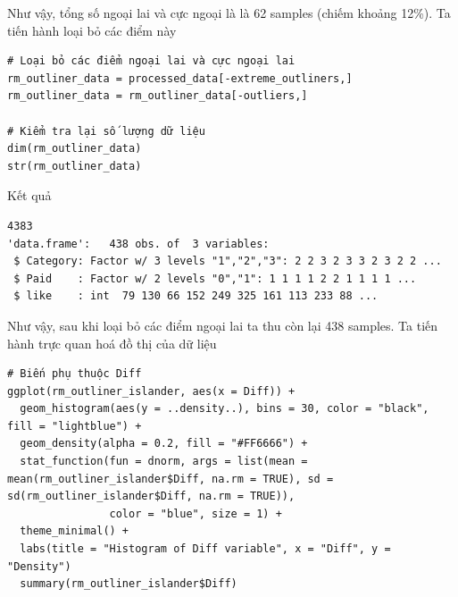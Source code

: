 \begin{itemize}
 Như vậy, tổng số ngoại lai và cực ngoại là là 62 samples (chiếm khoảng 12\%). Ta tiến hành loại bỏ các điểm này

 \begin{lstlisting}
# Loại bỏ các điểm ngoại lai và cực ngoại lai
rm_outliner_data = processed_data[-extreme_outliners,]
rm_outliner_data = rm_outliner_data[-outliers,]

# Kiểm tra lại số lượng dữ liệu
dim(rm_outliner_data)
str(rm_outliner_data)
 \end{lstlisting}
Kết quả
\begin{lstlisting}
4383
'data.frame':	438 obs. of  3 variables:
 $ Category: Factor w/ 3 levels "1","2","3": 2 2 3 2 3 3 2 3 2 2 ...
 $ Paid    : Factor w/ 2 levels "0","1": 1 1 1 1 2 2 1 1 1 1 ...
 $ like    : int  79 130 66 152 249 325 161 113 233 88 ...
\end{lstlisting}

\newpage
Như vậy, sau khi loại bỏ các điểm ngoại lai ta thu còn lại 438 samples. Ta tiến hành trực quan hoá đồ thị của dữ liệu

\begin{lstlisting}
# Biến phụ thuộc Diff
ggplot(rm_outliner_islander, aes(x = Diff)) +
  geom_histogram(aes(y = ..density..), bins = 30, color = "black", fill = "lightblue") +
  geom_density(alpha = 0.2, fill = "#FF6666") +
  stat_function(fun = dnorm, args = list(mean = mean(rm_outliner_islander$Diff, na.rm = TRUE), sd = sd(rm_outliner_islander$Diff, na.rm = TRUE)),
                color = "blue", size = 1) +
  theme_minimal() +
  labs(title = "Histogram of Diff variable", x = "Diff", y = "Density")
  summary(rm_outliner_islander$Diff)
\end{lstlisting}


\end{itemize}
